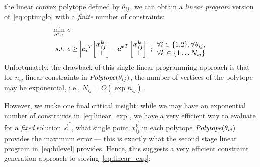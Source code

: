 the linear convex polytope defined by $\theta_{ij}$, we can obtain a
\emph{linear program} version of~\eqref{eq:optimglo} with a \emph{finite} 
number of constraints:
\begin{align}
\min_{\boldsymbol{c}^*,\epsilon} \; & \epsilon \label{eq:linear_exp} \\
s.t. \;       & \epsilon \geq \left| \boldsymbol{c_i}^T \! \begin{bmatrix} \boldsymbol{x_{ij}^k}\\1 \end{bmatrix} \! - \boldsymbol{c^*}^T \! \begin{bmatrix} \boldsymbol{x_{ij}^k}\\1 \end{bmatrix} \right|; 
\begin{array}{l}
\forall i \in \{ 1,\!2 \}, \forall \theta_{ij} \nonumber,\\ 
\forall k \in \{ 1 \ldots N_{ij} \}
\end{array}
\end{align}
Unfortunately, the drawback of this single linear programming approach
is that for $n_{ij}$ linear constraints in $\mathit{Polytope}(\theta_{ij})$, the
number of vertices of the polytope may be exponential, i.e., $N_{ij} =
O(\exp n_{ij})$.  

However, we make one final critical insight: while we may have
an exponential number of constraints in~\eqref{eq:linear_exp}, we have
a very efficient way to evaluate for a \emph{fixed} solution $\vec{c}^*$,
what single point $\vec{x_{ij}^k}$ in each polytope $\mathit{Polytope}(\theta_{ij})$
provides the maximum error --- this is exactly what the second stage
linear program in~\eqref{eq:bilevel} provides.  Hence, this suggests a
very efficient constraint generation approach to
solving~\eqref{eq:linear_exp}:

